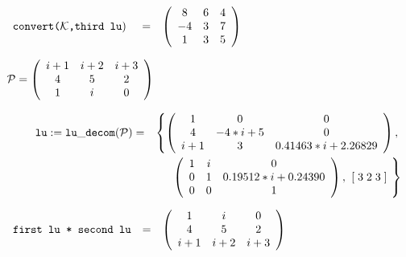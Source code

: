 \begin{flushleft}
\hspace*{0.1in}
\begin{math}
\begin{array}{ccc}
${\tt convert(${\cal K}$,third lu}$) \hspace*{0.055in} & = &
        \left( \begin{array}{ccc} 8 & 6 & 4 \\ -4 & 3 & 7 \\ 1 & 3 & 5
 \end{array} \right)
\end{array}
\end{math}
\end{flushleft}

\vspace*{0.5in}

\begin{flushleft}
\hspace*{0.175in}
\begin{math}
{\cal P} = \left( \begin{array}{ccc} i+1 & i+2 & i+3 \\ 4 & 5 & 2 \\ 1
& i & 0
\end{array} \right)
\end{math}
\end{flushleft}

\begin{eqnarray}
\hspace*{0.22in}
{\tt lu} := {\tt lu\_decom}({\cal P}) & = &
\left\{
        \left( \begin{array}{ccc} 1 & 0 & 0 \\ 4 & -4*i+5 & 0 \\ i+1 &
3 & 0.41463*i+2.26829 \end{array} \right), \right. \nonumber \\ & &
\left. \: \; \,  \left( \begin{array}{ccc} 1 & i & 0 \\ 0 & 1 &
0.19512*i+0.24390 \\ 0 & 0 & 1 \end{array} \right), \hspace*{0.05in}
[\; 3 \; 2 \; 3 \;] \hspace*{0.05in}
\right\} \nonumber
\end{eqnarray}

\vspace*{0.1in}

\begin{flushleft}
\hspace*{0.1in}
\begin{math}
\begin{array}{ccc}
${\tt first lu * second lu}$ & = &
        \left( \begin{array}{ccc} 1 & i & 0 \\ 4 & 5 & 2 \\ i+1 & i+2 &
i+3
 \end{array} \right)
\end{array}
\end{math}
\end{flushleft}

